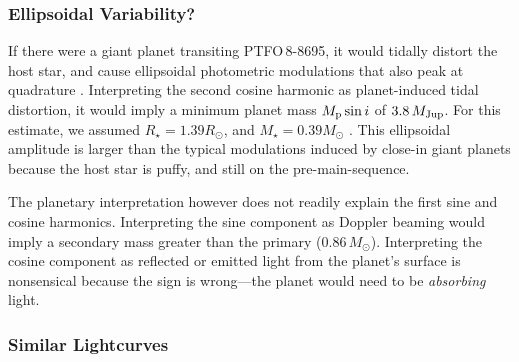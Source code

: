 \documentclass[12pt,twocolumn,tighten]{aastex62}
\newcommand{\ptfo}{PTFO$\,$8-8695}
\begin{document}
\subsubsection{Ellipsoidal Variability?}
If there were a giant planet transiting \ptfo, it would tidally
distort the host star, and cause ellipsoidal photometric modulations
that also peak at quadrature \citep[see][]{shporer_astrophysics_2017}.
Interpreting the second cosine harmonic as planet-induced tidal distortion,
it would imply a minimum planet mass $M_{\rm p} \sin i$ of
$3.8\,M_{\rm Jup}$.  For this estimate, we assumed $R_\star = 1.39
R_\odot$, and $M_\star = 0.39 M_\odot$ \citep{van_eyken_ptf_2012}.
This ellipsoidal amplitude is larger than the typical
modulations induced by close-in giant planets because the host star is
puffy, and still on the pre-main-sequence.

The planetary interpretation however does not readily explain the
first sine and cosine harmonics.  Interpreting the sine component as
Doppler beaming would imply a secondary mass greater than the primary
($0.86\,M_\odot$).  Interpreting the cosine component as reflected or
emitted light from the planet's surface is nonsensical because the sign is wrong---the
planet would need to be {\it absorbing} light.

\subsubsection{Similar Lightcurves}
\label{subsec:dipstars}
\end{document}
